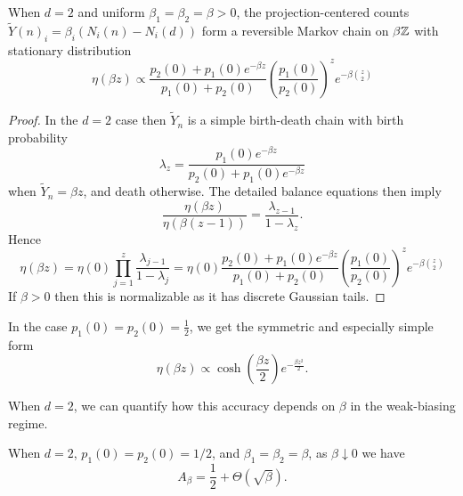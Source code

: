 \begin{lemma} \label{lem:2d_stationary_project_centered}
    When $d=2$ and uniform $\beta_1 = \beta_2 = \beta > 0$, the projection-centered 
    counts $\tilde{Y}(n)_i = \beta_i(N_i(n) - N_i(d))$ form a reversible Markov chain on $\beta\mathbb{Z}$ with stationary distribution
    \[\eta(\beta z) \propto  \frac{p_2(0) + p_1(0)e^{-\beta z}}{p_1(0) + p_2(0)} \left(\frac{p_1(0)}{p_2(0)}\right)^z e^{-\beta \binom{z}{2}}\]
\end{lemma}

\begin{proof}
    In the $d=2$ case then $\tilde{Y}_n$ is a simple birth-death chain with birth probability
        \[\lambda_z = \frac{p_1(0)e^{-\beta z}}{p_2(0) + p_1(0) e^{-\beta z}}\]
    \noindent when $\tilde{Y}_n = \beta z$, and death otherwise. The detailed balance equations then imply
        \[\frac{\eta(\beta z)}{\eta(\beta(z-1))} = \frac{\lambda_{z-1}}{1-\lambda_{z}}.\]
    \noindent Hence
        \[\eta(\beta z) = \eta(0) \prod_{j=1}^z \frac{\lambda_{j-1}}{1-\lambda_j} = \eta(0) \frac{p_2(0) + p_1(0)e^{-\beta z}}{p_1(0) + p_2(0)} \left(\frac{p_1(0)}{p_2(0)}\right)^z e^{-\beta \binom{z}{2}}\]
    \noindent If $\beta > 0$ then this is normalizable as it has discrete Gaussian tails.
\end{proof}

\noindent In the case $p_1(0) = p_2(0) = \frac{1}{2}$, we get the symmetric and especially simple form
%
\[\eta(\beta z) \propto \cosh\left(\frac{\beta z}{2}\right)  e^{-\frac{\beta z^2}{2}}.\]
%

\noindent When $d=2$, we can quantify how this accuracy depends on $\beta$ in the weak-biasing regime.

\begin{lemma}\label{lem:small_beta_adversarial}
    When $d=2$, $p_1(0)=p_2(0)=1/2$, and $\beta_1=\beta_2=\beta$, as $\beta \downarrow 0$ we have
    \[A_\beta = \frac{1}{2} + \Theta(\sqrt{\beta}). \]
\end{lemma}

